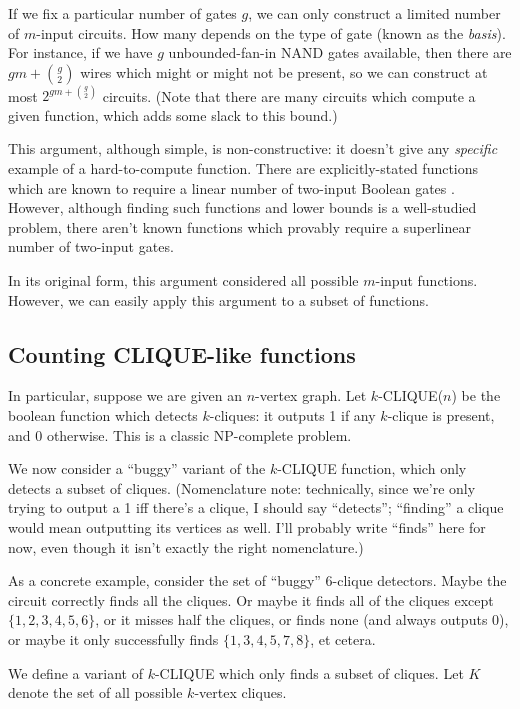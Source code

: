 \documentclass[12pt]{article}
\theoremstyle{definition}
\begin{document}
If we fix a particular number of gates $g$, we can only construct a limited
number of $m$-input circuits. How many depends on the type of gate (known as
the {\em basis}).
For instance,
if we have $g$ unbounded-fan-in NAND gates available, then there are
$gm + {g \choose 2}$ wires which might or might not be present, so 
we can construct at most $2^{gm + {g \choose 2}}$ circuits.
(Note that there are many circuits which compute a given function,
which adds some slack to this bound.)

This argument, although simple, is non-constructive: it doesn't give any
{\em specific} example of a hard-to-compute function.
There are explicitly-stated functions which are known to require
a linear number of two-input Boolean gates \cite{iwama2002explicit}.
However, although finding such functions and lower bounds is
a well-studied problem, there aren't known functions which provably require
a superlinear number of two-input gates.

In its original form, this argument considered all possible $m$-input functions.
However, we can easily apply this argument to a subset of functions.

\subsection{Counting CLIQUE-like functions}

In particular, suppose we are given an $n$-vertex graph.
Let $k$-CLIQUE($n$) be the boolean function which
detects $k$-cliques: it outputs 1 if any $k$-clique
is present, and 0 otherwise. This is a classic
NP-complete problem.

We now consider a ``buggy'' variant of the $k$-CLIQUE function,
which only detects a subset of cliques. (Nomenclature note:
technically, since
we're only trying to output a 1 iff there's a clique, I should say
``detects''; ``finding'' a clique would mean outputting its
vertices as well. I'll probably write ``finds'' here for now,
even though it isn't exactly the right nomenclature.)

As a concrete example,
consider the set of ``buggy'' 6-clique detectors.
Maybe the circuit correctly
finds all the cliques. Or maybe it finds all of the cliques except $\{1,2,3,4,5,6\}$,
or it misses half the cliques, or finds none (and always outputs 0), or maybe
it only successfully finds $\{1,3,4,5,7,8\}$, et cetera.

We define a variant of $k$-CLIQUE which only
finds a subset of cliques.
Let $K$ denote the set of all possible
$k$-vertex cliques.
\end{document}
